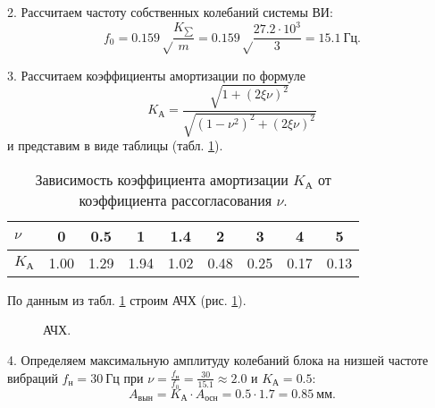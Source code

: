 2. Рассчитаем частоту собственных колебаний системы ВИ:
\[
    f_0 = 0.159 \sqrt \frac{K_{\sum}}{m}
        = 0.159 \sqrt \frac{27.2 \cdot 10^3}{3}
        = 15.1~Гц.
\]

3. Рассчитаем коэффициенты амортизации по формуле
\[
    K_{А} = \frac{\sqrt{1 + (2 \xi \nu)^2}}{\sqrt{(1 - \nu^2)^2 + (2 \xi \nu)^2}}
\]
и представим в виде таблицы (табл. \ref{tab:amortisation_coeffs}).

\begin{table}[!h]
    \centering
    \caption{Зависимость коэффициента амортизации $K_{А}$ от коэффициента рассогласования $\nu$.}
    \label{tab:amortisation_coeffs}
    \begin{tabular}{|l|c|c|c|c|c|c|c|c|}
        \hline
        $\nu$  & 0    & 0.5  & 1    & 1.4  & 2    & 3    & 4    & 5    \\ \hline
        $K_{А}$  & 1.00 & 1.29 & 1.94 & 1.02 & 0.48 & 0.25 & 0.17 & 0.13 \\ \hline
    \end{tabular}
\end{table}

По данным из табл. \ref{tab:amortisation_coeffs} строим АЧХ (рис. \ref{fig:frequency-response}).

\begin{figure}[!h]
    \centering
    \caption{АЧХ.}
    \label{fig:frequency-response}
\end{figure}

4. Определяем максимальную амплитуду колебаний блока на низшей частоте вибраций $f_{н} = 30~Гц$ при $\nu = \frac{f_{н}}{f_0} = \frac{30}{15.1} \approx 2.0$ и $K_{А} = 0.5$:
\[
    A_{вын} = K_{А} \cdot A_{осн}
    = 0.5 \cdot 1.7
    = 0.85~мм.
\]

